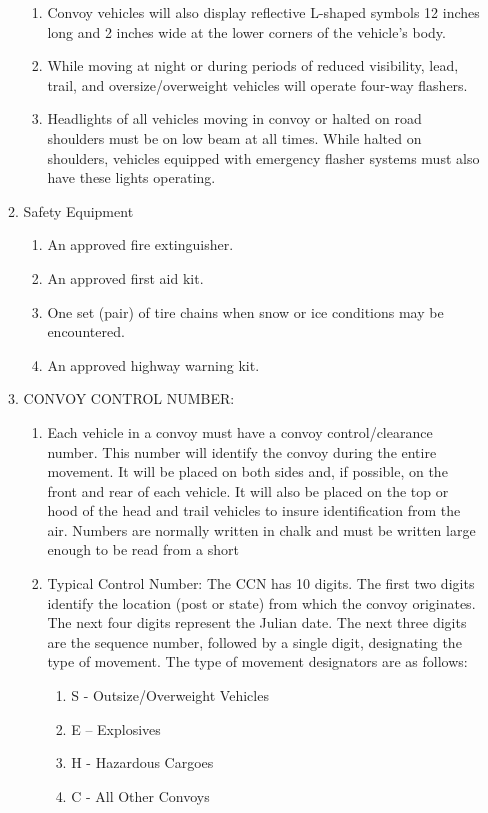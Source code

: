 \documentclass{article}
\begin{document}
\begin{enumerate}
\begin{enumerate}
\begin{enumerate}
\item Convoy vehicles will also display reflective L-shaped symbols 12 inches long and 2 inches wide at the lower corners of the vehicle's body.
\item While moving at night or during periods of reduced visibility, lead, trail, and oversize/overweight vehicles will operate four-way flashers. 
\item Headlights of all vehicles moving in convoy or halted on road shoulders must be on low beam at all times. While halted on shoulders, vehicles equipped with emergency flasher systems must also have these lights operating. 
\end{enumerate}
\item	Safety Equipment
\begin{enumerate}
    \item An approved fire extinguisher. 
\item An approved first aid kit. 
\item One set (pair) of tire chains when snow or ice conditions may be encountered. 
\item An approved highway warning kit.
\end{enumerate}
\item	CONVOY CONTROL NUMBER:
\begin{enumerate}
    \item Each vehicle in a convoy must have a convoy control/clearance number.  This number will identify the convoy during the entire movement. It will be placed on both sides and, if possible, on the front and rear of each vehicle. It will also be placed on the top or hood of the head and trail vehicles to insure identification from the air. Numbers are normally written in chalk and must be written large enough to be read from a short \item Typical Control Number: The CCN has 10 digits. The first two digits identify the location (post or state) from which the convoy originates. The next four digits represent the Julian date. The next three digits are the sequence number, followed by a single digit, designating the type of movement. The type of movement designators are as follows:
    \begin{enumerate}
    \item S - Outsize/Overweight Vehicles
\item E – Explosives
\item	H - Hazardous Cargoes
\item	C - All Other Convoys
    \end{enumerate}

\end{enumerate}
\end{enumerate}
\end{enumerate}
\end{document}
